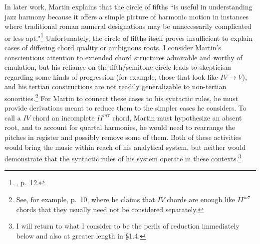 In later work, Martin explains that the circle of fifths ``is useful in understanding jazz harmony because it offers a simple picture of harmonic motion in instances where traditional roman numeral designations may be unnecessarily complicated or less apt."\footnote{\cite{martin1988}, p.\ 12.}  Unfortunately, the circle of fifths itself proves insufficient to explain cases of differing chord quality or ambiguous roots.  I consider Martin's conscientious attention to extended chord structures admirable and worthy of emulation, but his reliance on the fifth/semitone circle leads to skepticism regarding some kinds of progression (for example, those that look like $IV \rightarrow V$), and his tertian constructions are not readily generalizable to non-tertian sonorities.\footnote{See, for example, \cite{martin1988} p.\ 10, where he claims that $IV$ chords are enough like $II^{m7}$ chords that they usually need not be considered separately.}  For Martin to connect these cases to his syntactic rules, he must provide derivations meant to reduce them to the simpler cases he considers.  To call a $IV$ chord an incomplete $II^{m7}$ chord, Martin must hypothesize an absent root, and to account for quartal harmonies, he would need to rearrange the pitches in register and possibly remove some of them.  Both of these activities would bring the music within reach of his analytical system, but neither would demonstrate that the syntactic rules of his system operate in these contexts.\footnote{I will return to what I consider to be the perils of reduction immediately below and also at greater length in \S 1.4.}

